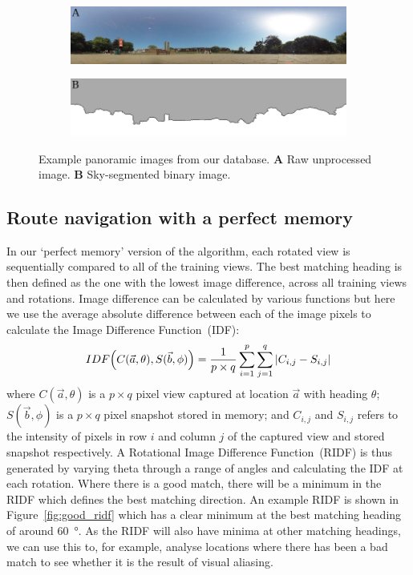 \documentclass[letterpaper]{article}
\begin{document}
\begin{figure}[t]
    \centering
    \begin{subfigure}[b]{\columnwidth}
        \includegraphics[width=\columnwidth]{figures/360_240.jpg}
    \end{subfigure}
    \begin{subfigure}[b]{\columnwidth}
        \includegraphics[width=\columnwidth]{figures/360_240_mask.png}
    \end{subfigure}
    \caption{Example panoramic images from our database.
    \textbf{A} Raw unprocessed image.
    \textbf{B} Sky-segmented binary image.}
    \label{fig:database_images}
\end{figure}

\subsection{Route navigation with a perfect memory}
\label{sec:ridf_perfect_memory}
In our `perfect memory' version of the algorithm, each rotated view is sequentially compared to all of the training views. 
The best matching heading is then defined as the one with the lowest image difference, across all training views and rotations. 
Image difference can be calculated by various functions but here we use the average absolute difference between each of the image pixels to calculate the Image Difference Function~(IDF):
%
\begin{align}
    IDF\Bigl(C(\vec{a}, \theta), S(\vec{b}, \phi)\Bigr) = \frac{1}{p \times q} \sum\limits_{i=1}^p{\sum\limits_{j=1}^q|{C_{i,j} - S_{i,j}|}}
\end{align}
%
where $C(\vec{a}, \theta)$ is a $p \times q$ pixel view captured at location $\vec{a}$ with heading $\theta$; $S(\vec{b}, \phi)$ is a $p \times q$ pixel snapshot stored in memory; and $C_{i,j}$ and $S_{i,j}$ refers to the intensity of pixels in row $i$ and column $j$ of the captured view and stored snapshot respectively.
A Rotational Image Difference Function~(RIDF) is thus generated by varying theta through a range of angles and calculating the IDF at each rotation. 
Where there is a good match, there will be a minimum in the RIDF which defines the best matching direction. 
An example RIDF is shown in Figure~\ref{fig:good_ridf} which has a clear minimum at the best matching heading of around \SI{60}{\degree}.
As the RIDF will also have minima at other matching headings, we can use this to, for example, analyse locations where there has been a bad match to see whether it is the result of visual aliasing.
\end{document}
